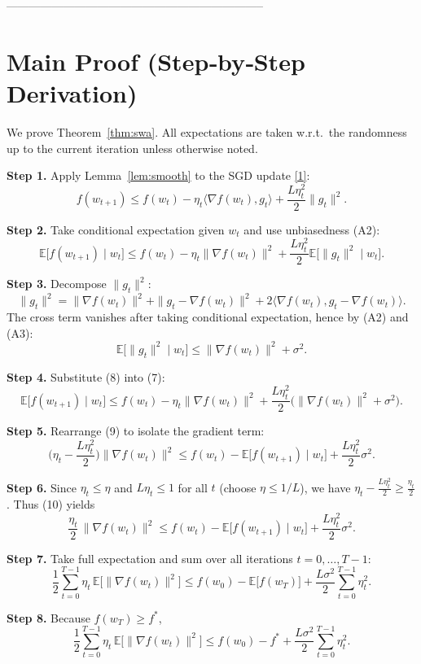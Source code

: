 \documentclass{article}
\newcommand{\E}{\mathbb{E}}
\begin{document}
--------------------------------------------------------------------

\section*{Main Proof (Step‑by‑Step Derivation)}
We prove Theorem~\ref{thm:swa}.  All expectations are taken w.r.t.\ the
randomness up to the current iteration unless otherwise noted.

\noindent\textbf{Step 1.} Apply Lemma~\ref{lem:smooth} to the SGD update \eqref{1}:
\[
f(w_{t+1})\le f(w_t)-\eta_t\langle\nabla f(w_t),g_t\rangle
+\frac{L\eta_t^{2}}{2}\|g_t\|^{2}. \tag{6}
\]

\noindent\textbf{Step 2.} Take conditional expectation given $w_t$ and use
unbiasedness (A2):
\[
\E\!\big[f(w_{t+1})\mid w_t\big]\le
f(w_t)-\eta_t\|\nabla f(w_t)\|^{2}
+\frac{L\eta_t^{2}}{2}\E\!\big[\|g_t\|^{2}\mid w_t\big]. \tag{7}
\]

\noindent\textbf{Step 3.} Decompose $\|g_t\|^{2}$:
\[
\|g_t\|^{2}= \|\nabla f(w_t)\|^{2}
+ \|g_t-\nabla f(w_t)\|^{2}
+2\langle\nabla f(w_t),g_t-\nabla f(w_t)\rangle.
\]
The cross term vanishes after taking conditional expectation, hence by (A2) and (A3):
\[
\E\!\big[\|g_t\|^{2}\mid w_t\big]\le \|\nabla f(w_t)\|^{2}+\sigma^{2}. \tag{8}
\]

\noindent\textbf{Step 4.} Substitute (8) into (7):
\[
\E\!\big[f(w_{t+1})\mid w_t\big]\le
f(w_t)-\eta_t\|\nabla f(w_t)\|^{2}
+\frac{L\eta_t^{2}}{2}\big(\|\nabla f(w_t)\|^{2}+\sigma^{2}\big). \tag{9}
\]

\noindent\textbf{Step 5.} Rearrange (9) to isolate the gradient term:
\[
\big(\eta_t-\frac{L\eta_t^{2}}{2}\big)\|\nabla f(w_t)\|^{2}
\le f(w_t)-\E\!\big[f(w_{t+1})\mid w_t\big]
+\frac{L\eta_t^{2}}{2}\sigma^{2}. \tag{10}
\]

\noindent\textbf{Step 6.} Since $\eta_t\le \eta$ and $L\eta_t\le 1$ for all $t$
(choose $\eta\le 1/L$), we have $\eta_t-\frac{L\eta_t^{2}}{2}\ge \frac{\eta_t}{2}$.
Thus (10) yields
\[
\frac{\eta_t}{2}\,\|\nabla f(w_t)\|^{2}
\le f(w_t)-\E\!\big[f(w_{t+1})\mid w_t\big]
+\frac{L\eta_t^{2}}{2}\sigma^{2}. \tag{11}
\]

\noindent\textbf{Step 7.} Take full expectation and sum over all iterations
$t=0,\dots,T-1$:
\[
\frac{1}{2}\sum_{t=0}^{T-1}\eta_t\,\E\!\big[\|\nabla f(w_t)\|^{2}\big]
\le f(w_0)-\E\!\big[f(w_T)\big]
+\frac{L\sigma^{2}}{2}\sum_{t=0}^{T-1}\eta_t^{2}. \tag{12}
\]

\noindent\textbf{Step 8.} Because $f(w_T)\ge f^{*}$,
\[
\frac{1}{2}\sum_{t=0}^{T-1}\eta_t\,\E\!\big[\|\nabla f(w_t)\|^{2}\big]
\le f(w_0)-f^{*}
+\frac{L\sigma^{2}}{2}\sum_{t=0}^{T-1}\eta_t^{2}. \tag{13}
\]
\end{document}
